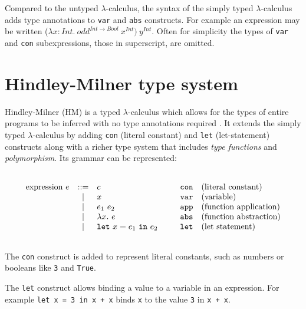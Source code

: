 \documentclass[a4paper,fleqn,oneside,12pt]{report}
\begin{document}
Compared to the untyped $\lambda$-calculus, the syntax of the simply typed $\lambda$-calculus adds type annotations to \texttt{var} and \texttt{abs} constructs. For example an expression may be written ($\lambda x: Int.\ odd^{Int \rightarrow Bool}\ x^{Int})\ y^{Int}$. Often for simplicity the types of \texttt{var} and \texttt{con} subexpressions, those in superscript, are omitted.

\section{Hindley-Milner type system}\label{id:h.gsouq2axz3k}

Hindley-Milner (HM) is a typed $\lambda$-calculus which allows for the types of entire programs to be inferred with no type annotations required \citep{ref12,ref13}. It extends the simply typed $\lambda$-calculus by adding \texttt{con} (literal constant) and \texttt{let} (let-statement) constructs along with a richer type system that includes \textit{type functions} and \textit{polymorphism}. Its grammar can be represented:

$$\begin{array}{lcllll}
  \\
    \textrm{expression}\ e & ::= & c                       & \hspace{0.25cm} & \mathtt{con} & \textrm{(literal constant)}\\
                         & \vert & x                                       & & \mathtt{var} & \textrm{(variable)}\\
                         & \vert & e_1\ e_2                                & & \mathtt{app} & \textrm{(function application)}\\
                         & \vert & \lambda x.\ e                           & & \mathtt{abs} & \textrm{(function abstraction)} \\
                         & \vert & \mathtt{let}\ x = e_1\ \mathtt{in}\ e_2 & & \mathtt{let} & \textrm{(let statement)}\\
  \\
\end{array}$$

The \texttt{con} construct is added to represent literal constants, such as numbers or booleans like \texttt{3} and \texttt{True}.

The \texttt{let} construct allows binding a value to a variable in an expression. For example \texttt{let x = 3 in x + x} binds \texttt{x} to the value \texttt{3} in \texttt{x + x}.
\end{document}
